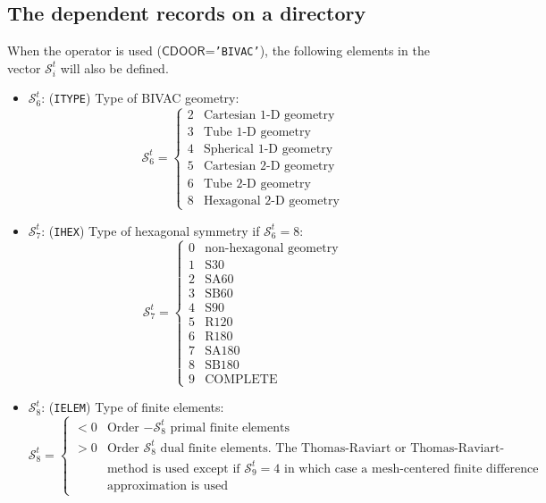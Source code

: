 \subsection{The  dependent records on a
 directory}\label{sect:bivactrackingdir}

When the  operator is used ($\mathsf{CDOOR}$={\tt 'BIVAC'}), the following elements in the vector
$\mathcal{S}^{t}_{i}$ will also be defined.

\begin{itemize}
\item $\mathcal{S}^{t}_{6}$: ({\tt ITYPE}) Type of BIVAC geometry:
\begin{displaymath}
\mathcal{S}^{t}_{6} = \left\{
\begin{array}{rl}
 2 & \textrm{Cartesian 1-D geometry} \\
 3 & \textrm{Tube 1-D geometry} \\
 4 & \textrm{Spherical 1-D geometry} \\
 5 & \textrm{Cartesian 2-D geometry} \\
 6 & \textrm{Tube 2-D geometry} \\
 8 & \textrm{Hexagonal 2-D geometry}
\end{array} \right.
\end{displaymath}

\item $\mathcal{S}^{t}_{7}$: ({\tt IHEX}) Type of hexagonal symmetry if $\mathcal{S}^{t}_{6}= 8$:
\begin{displaymath}
\mathcal{S}^{t}_{7} = \left\{
\begin{array}{rl}
 0 & \textrm{non-hexagonal geometry} \\
 1 & \textrm{S30} \\
 2 & \textrm{SA60} \\
 3 & \textrm{SB60} \\
 4 & \textrm{S90} \\
 5 & \textrm{R120} \\
 6 & \textrm{R180} \\
 7 & \textrm{SA180} \\
 8 & \textrm{SB180} \\
 9 & \textrm{COMPLETE}
\end{array} \right.
\end{displaymath}

\item $\mathcal{S}^{t}_{8}$: ({\tt IELEM}) Type of finite elements:
\begin{displaymath}
\mathcal{S}^{t}_{8} = \left\{
\begin{array}{rl}
 <0 & \textrm{Order $-\mathcal{S}^{t}_{8}$ primal finite elements} \\
 >0 & \textrm{Order $\mathcal{S}^{t}_{8}$ dual finite elements. The Thomas-Raviart or Thomas-Raviart-Schneider} \\
    & \textrm{method is used except if $\mathcal{S}^{t}_{9}=4$ in which case a mesh-centered finite difference} \\
    & \textrm{approximation is used}
\end{array} \right.
\end{displaymath}


\end{itemize}
